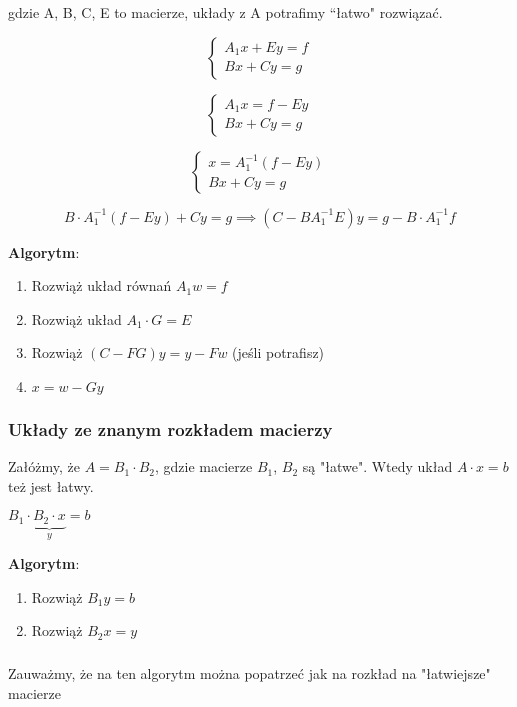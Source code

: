 \documentclass[hidelinks,a4paper]{article}
\begin{document}
gdzie A, B, C, E to macierze, układy z A potrafimy ``łatwo" rozwiązać.

\[
	\left\{ \begin{array}{l}
	A_1x + Ey = f\\
	Bx + Cy = g
	\end{array} \right.
\]

\[
	\left\{ \begin{array}{l}
	A_1x = f - Ey\\
	Bx + Cy = g
	\end{array} \right.
\]


\[
	\left\{ \begin{array}{l}
	x = A_1^{-1}(f - Ey)\\
	Bx + Cy = g
	\end{array} \right.
\]

\[
	B \cdot A_1^{-1} (f - Ey) + Cy = g \implies (C - BA_1^{-1}E)y = g - B\cdot A_1^{-1}f
\]

\textbf{Algorytm}:

\begin{enumerate}
	\item Rozwiąż układ równań $A_1w = f$
	\item Rozwiąż układ $A_1 \cdot G = E$
	\item Rozwiąż $(C-FG)y = y - Fw$ (jeśli potrafisz)
	\item $x = w - Gy$
\end{enumerate}


\subsubsection{Układy ze znanym rozkładem macierzy}

Załóżmy, że $A = B_1 \cdot B_2$, gdzie macierze $B_1$, $B_2$ są "łatwe". Wtedy układ $A\cdot x = b$ też jest łatwy.

$B_1 \cdot \underbrace{ B_2 \cdot x}_{y} = b$

\textbf{Algorytm}:

\begin{enumerate}
	\item Rozwiąż $B_1 y = b$
	\item Rozwiąż $B_2 x = y$
\end{enumerate}

\subsubsection{}

Zauważmy, że na ten algorytm można popatrzeć jak na rozkład na "łatwiejsze" macierze
\end{document}
